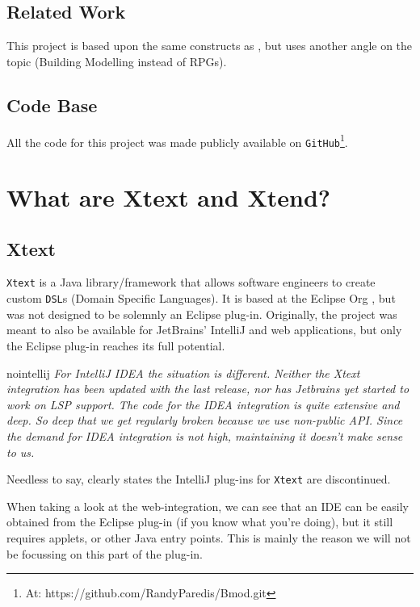 \documentclass[review]{elsarticle}
\begin{document}
\subsection{Related Work}
This project is based upon the same constructs as \cite{Hannu2014}, but uses another angle on the topic (Building Modelling instead of RPGs).

\subsection{Code Base}
All the code for this project was made publicly available on \texttt{GitHub}\footnote{At: https://github.com/RandyParedis/Bmod.git}.




\section{What are Xtext and Xtend?}
\label{sec:xtext}

\subsection{Xtext}
\texttt{Xtext} \cite{xtext} is a \textsf{Java} library/framework that allows software engineers to create custom \texttt{DSL}s (Domain Specific Languages). It is based at the \textsf{Eclipse Org} \cite{eclipse}, but was not designed to be solemnly an \textsf{Eclipse} plug-in. Originally, the project was meant to also be available for \textsf{JetBrains}' \textsf{IntelliJ} and web applications, but only the \textsf{Eclipse} plug-in reaches its full potential.

\begin{displaycquote}{nointellij}
	\textit{For IntelliJ IDEA the situation is different. Neither the Xtext integration has been updated with the last release, nor has Jetbrains yet started to work on LSP support. The code for the IDEA integration is quite extensive and deep. So deep that we get regularly broken because we use non-public API. Since the demand for IDEA integration is not high, maintaining it doesn’t make sense to us.}
\end{displaycquote}

Needless to say, \cite{nointellij} clearly states the \textsf{IntelliJ} plug-ins for \texttt{Xtext} are discontinued.

When taking a look at the web-integration, we can see that an \textsf{IDE} can be easily obtained from the \textsf{Eclipse} plug-in (if you know what you're doing), but it still requires applets, or other \textsf{Java} entry points. This is mainly the reason we will not be focussing on this part of the plug-in.
\end{document}
